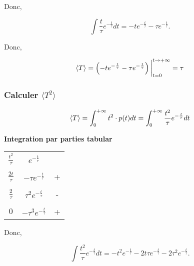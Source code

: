 \documentclass[french]{article}
\begin{document}
{\begin{tcolorbox}[colback=yellow!5!white,colframe=yellow!75!black]
			Donc,
			
			\begin{equation}
			\int \frac{t}{\tau}e^{-\frac{t}{\tau}} dt = -te^{-\frac{t}{\tau}} - \tau e^{-\frac{t}{\tau}}.
			\end{equation}
			
		\end{tcolorbox}
	
		Donc,
		
		\begin{dmath}
			\langle T \rangle = \left( -te^{-\frac{t}{\tau}} - \tau e^{-\frac{t}{\tau}} \right)\bigg\rvert_{t=0}^{t \to +\infty}\\
			= \tau
		\end{dmath}
	
		\subsubsection*{Calculer $\langle T^2 \rangle$}
		
		\begin{equation}
		\langle T \rangle = \int_{0}^{+\infty} t^2 \cdot p(t) dt\\
		= \int_{0}^{+\infty} \frac{t^2}{\tau}e^{-\frac{t}{\tau}} dt\\
		\end{equation}
		
		\begin{tcolorbox}[colback=yellow!5!white,colframe=yellow!75!black]
			\textbf{\large{Integration par parties tabular}}
			
			\begin{center}
				\begin{tabular}[5pt]{c c c}
					$\frac{t^2}{\tau}$ & $e^{-\frac{t}{\tau}}$  &  \\ \\[-1em]
					$\frac{2t}{\tau}$ & $-\tau e^{-\frac{t}{\tau}}$  &  +\\ \\[-1em]
					$\frac{2}{\tau}$& $\tau^2e^{-\frac{t}{\tau}}$ &  -\\ \\[-1em]
					$0$& $-\tau^3e^{-\frac{t}{\tau}}$ &  +\\
				\end{tabular}
			\end{center}
			
			Donc,
			
			\begin{equation}
			\int \frac{t^2}{\tau}e^{-\frac{t}{\tau}} dt = -t^2e^{-\frac{t}{\tau}} - 2t\tau e^{-\frac{t}{\tau}} -2\tau^2e^{-\frac{t}{\tau}}.
			\end{equation}
			

\end{tcolorbox}}
\end{document}
